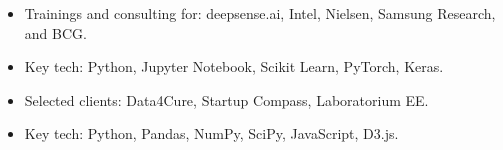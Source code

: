 \documentclass[10pt,a4paper,ragged2e,withhyper]{altacv}
\begin{document}
\begin{paracol}{2}
\divider

\begin{itemize}
\item Trainings and consulting for: deepsense.ai, Intel, Nielsen, Samsung Research, and BCG.
\item Key tech: Python, Jupyter Notebook, Scikit Learn, PyTorch, Keras.
\end{itemize}

\divider

\begin{itemize}
\item Selected clients: Data4Cure, Startup Compass, Laboratorium EE.
\item Key tech: Python, Pandas, NumPy, SciPy, JavaScript, D3.js.
\end{itemize}








\end{paracol}
\end{document}
